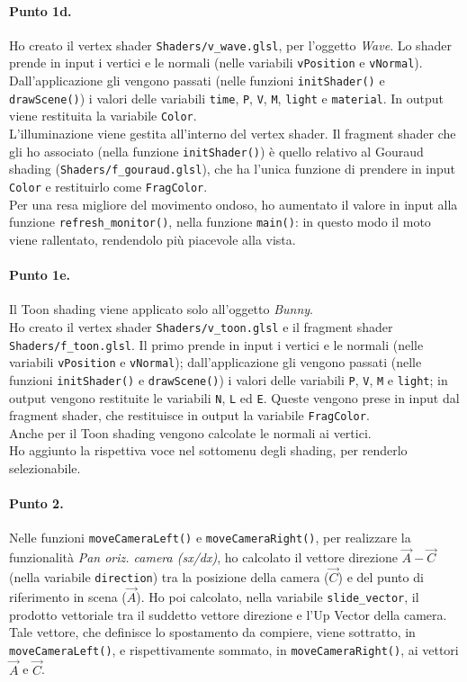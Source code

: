 \documentclass[a4paper, 12pt]{article}
\begin{document}
\paragraph{Punto 1d.}
Ho creato il vertex shader \texttt{Shaders/v\_wave.glsl}, per l'oggetto \textit{Wave}. Lo shader prende in input i vertici e le normali (nelle variabili \texttt{vPosition} e \texttt{vNormal}). Dall'applicazione gli vengono passati (nelle funzioni \texttt{initShader()} e \texttt{drawScene()}) i valori delle variabili \texttt{time}, \texttt{P}, \texttt{V}, \texttt{M}, \texttt{light} e \texttt{material}. In output viene restituita la variabile \texttt{Color}.\\
L'illuminazione viene gestita all'interno del vertex shader. Il fragment shader che gli ho associato (nella funzione \texttt{initShader()}) è quello relativo al Gouraud shading (\texttt{Shaders/\allowbreak f\_gouraud.glsl}), che ha l'unica funzione di prendere in input \texttt{Color} e restituirlo come \texttt{FragColor}.\\
Per una resa migliore del movimento ondoso, ho  aumentato il valore in input alla funzione \texttt{refresh\_monitor()}, nella funzione \texttt{main()}: in questo modo il moto viene rallentato, rendendolo più piacevole alla vista.

\paragraph{Punto 1e.}
Il Toon shading viene applicato solo all'oggetto \textit{Bunny}.\\
Ho creato il vertex shader \texttt{Shaders/v\_toon.glsl} e il fragment shader \texttt{Shaders/\allowbreak f\_toon.glsl}. Il primo prende in input i vertici e le normali (nelle variabili \texttt{vPosition} e \texttt{vNormal}); dall'applicazione gli vengono passati (nelle funzioni \texttt{initShader()} e \texttt{drawScene()}) i valori delle variabili \texttt{P}, \texttt{V}, \texttt{M} e \texttt{light}; in output vengono restituite le variabili \texttt{N}, \texttt{L} ed \texttt{E}. Queste vengono prese in input dal fragment shader, che restituisce in output la variabile \texttt{FragColor}.\\
Anche per il Toon shading vengono calcolate le normali ai vertici.\\
Ho aggiunto la rispettiva voce nel sottomenu degli shading, per renderlo selezionabile.

\paragraph{Punto 2.}
Nelle funzioni \texttt{moveCameraLeft()} e \texttt{moveCameraRight()}, per realizzare la funzionalità \textit{Pan oriz. camera (sx/dx)}, ho calcolato il vettore direzione $\vec{A} - \vec{C}$ (nella variabile \texttt{direction}) tra la posizione della camera ($\vec{C}$) e del punto di riferimento in scena ($\vec{A}$). Ho poi calcolato, nella variabile \texttt{slide\_vector}, il prodotto vettoriale tra il suddetto vettore direzione e l'Up Vector della camera. Tale vettore, che definisce lo spostamento da compiere, viene sottratto, in \texttt{moveCameraLeft()}, e rispettivamente sommato, in \texttt{moveCameraRight()}, ai vettori $\vec{A}$ e $\vec{C}$.
\end{document}
